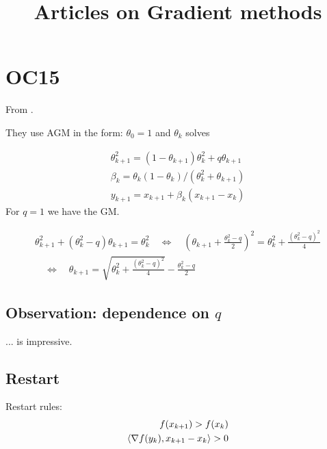 \documentclass[12pt,english]{article}
\begin{document}

\title{Articles on Gradient methods}
\author{}
\maketitle
\tableofcontents

%
\section{OC15}\label{sec:}
%
From \cite{ODonoghueCandes15}.

They use AGM in the form: $\theta_0=1$ and  $\theta_k$ solves

\begin{align*}
\theta_{k+1}^2 = (1-\theta_{k+1})\theta_k^2+ q\theta_{k+1}\\
\beta_k = \theta_k(1-\theta_k)/(\theta_k^2+\theta_{k+1}) \\
y_{k+1} = x_{k+1} + \beta_k(x_{k+1}-x_{k})
\end{align*}
%
For $q=1$ we have the GM.


%
\begin{align*}
\theta_{k+1}^2 + (\theta_k^2- q)\theta_{k+1}= \theta_k^2
\quad\Leftrightarrow\quad 
\left( \theta_{k+1} + \frac{\theta_k^2- q}{2}\right)^2 = \theta_k^2 + \frac{(\theta_k^2- q)^2}{4}\\
\quad\Leftrightarrow\quad 
\theta_{k+1} = \sqrt{\theta_k^2 + \frac{(\theta_k^2- q)^2}{4}}-\frac{\theta_k^2- q}{2}
\end{align*}
%

%
\subsection{Observation: dependence on $q$}\label{subsec:}
%
... is impressive.
%
\subsection{Restart}\label{subsec:}
%
Restart rules:
%
\begin{align*}
f(x_{k+1}) > f(x_k)\\
\langle\nabla f(y_k),x_{k+1}-x_{k}\rangle >0
\end{align*}
%
%
\end{document}
